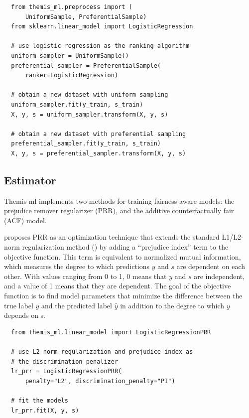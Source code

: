 \documentclass[man,natbib]{apa6}
\begin{document}
\begin{verbatim}
  from themis_ml.preprocess import (
      UniformSample, PreferentialSample)
  from sklearn.linear_model import LogisticRegression

  # use logistic regression as the ranking algorithm
  uniform_sampler = UniformSample()
  preferential_sampler = PreferentialSample(
      ranker=LogisticRegression)

  # obtain a new dataset with uniform sampling
  uniform_sampler.fit(y_train, s_train)
  X, y, s = uniform_sampler.transform(X, y, s)

  # obtain a new dataset with preferential sampling
  preferential_sampler.fit(y_train, s_train)
  X, y, s = preferential_sampler.transform(X, y, s)
\end{verbatim}

\subsection{Estimator}

Themis-ml implements two methods for training fairness-aware models: the
prejudice remover regularizer (PRR), and the additive counterfactually fair
(ACF) model.

\cite{kamishima2012fairness} proposes PRR as an optimization technique that
extends the standard L1/L2-norm regularization method (\citealp{ng2004feature,
ribeiro2016should, park2007l1}) by adding a ``prejudice index'' term to the
objective function. This term is equivalent to normalized mutual information,
which measures the degree to which predictions \(y\) and \(s\) are dependent on
each other. With values ranging from 0 to 1, 0 means that \(y\) and \(s\) are
independent, and a value of 1 means that they are dependent. The goal of the
objective function is to find model parameters that minimize the difference
between the true label \(y\) and the predicted label \(\hat{y}\) in addition to
the degree to which \(y\) depends on s.

\begin{verbatim}
  from themis_ml.linear_model import LogisticRegressionPRR

  # use L2-norm regularization and prejudice index as
  # the discrimination penalizer
  lr_prr = LogisticRegressionPRR(
      penalty="L2", discrimination_penalty="PI")

  # fit the models
  lr_prr.fit(X, y, s)
\end{verbatim}
\end{document}
